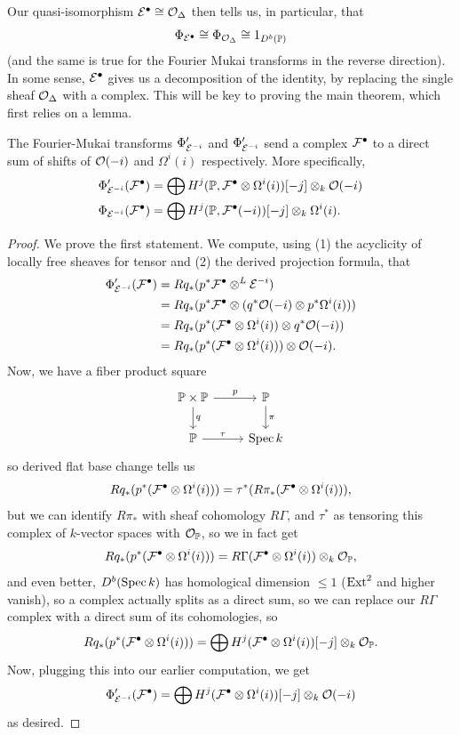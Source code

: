 \documentclass[12pt]{article}
\begin{document}
Our quasi-isomorphism $\mathcal{E}^\bullet \cong \mathcal{O}_\Delta$ then tells us, in particular, that
\[\Phi_{\mathcal{E}^\bullet} \cong \Phi_{\mathcal{O}_\Delta} \cong 1_{D^b(\mathbb{P})}\]
(and the same is true for the Fourier Mukai transforms in the reverse direction). In some sense, $\mathcal{E}^\bullet$ gives us a decomposition of the identity, by replacing the single sheaf $\mathcal{O}_\Delta$ with a complex. This will be key to proving the main theorem, which first relies on a lemma.

\begin{lem}\label{fm-against-vb-box-prod}
    The Fourier-Mukai transforms $\Phi_{\mathcal{E}^{-i}}'$ and $\Phi_{\mathcal{E}^{-i}}'$ send a complex $\mathcal{F}^\bullet$ to a direct sum of shifts of $\mathcal{O}(-i)$ and $\Omega^i(i)$ respectively. More specifically,
    \begin{align*}
        \Phi_{\mathcal{E}^{-i}}'(\mathcal{F}^\bullet) &= \bigoplus H^j(\mathbb{P},\mathcal{F}^\bullet\otimes \Omega^i(i))[-j] \otimes_k \mathcal{O}(-i)\\
        \Phi_{\mathcal{E}^{-i}}(\mathcal{F}^\bullet) &= \bigoplus H^j(\mathbb{P},\mathcal{F}^\bullet(-i))[-j] \otimes_k \Omega^i(i).
    \end{align*}
\end{lem}
\begin{proof}
    We prove the first statement. We compute, using (1) the acyclicity of locally free sheaves for tensor and (2) the derived projection formula, that
    \begin{align*}
        \Phi_{\mathcal{E}^{-i}}'(\mathcal{F}^\bullet) &= Rq_*(p^* \mathcal{F}^\bullet \otimes^L \mathcal{E}^{-i})\\
        &= Rq_*(p^*\mathcal{F}^\bullet \otimes (q^* \mathcal{O}(-i) \otimes p^*\Omega^i(i)))\\
        &= Rq_*(p^*(\mathcal{F}^\bullet \otimes \Omega^i(i)) \otimes q^* \mathcal{O}(-i))\\
        &= Rq_*(p^*(\mathcal{F}^\bullet \otimes \Omega^i(i))) \otimes \mathcal{O}(-i).
    \end{align*}
    Now, we have a fiber product square
    \[\begin{tikzcd}
        \P\times \P \rar["p"]\dar["q"] & \P\dar["\pi"]\\
        \P \rar["\tau"] & \Spec k
    \end{tikzcd}\]
    so derived flat base change tells us
    \[Rq_*(p^*(\mathcal{F}^\bullet \otimes \Omega^i(i))) = \tau^*(R\pi_*(\mathcal{F}^\bullet \otimes \Omega^i(i))),\]
    but we can identify $R\pi_*$ with sheaf cohomology $R\Gamma$, and $\tau^*$ as tensoring this complex of $k$-vector spaces with $\mathcal{O}_{\mathbb{P}}$, so we in fact get
    \[Rq_*(p^*(\mathcal{F}^\bullet \otimes \Omega^i(i))) = R\Gamma(\mathcal{F}^\bullet \otimes \Omega^i(i)) \otimes_k \mathcal{O}_{\mathbb{P}},\]
    and even better, $D^b(\operatorname{Spec} k)$ has homological dimension $\leq 1$ ($\mathrm{Ext}^2$ and higher vanish), so a complex actually splits as a direct sum, so we can replace our $R\Gamma$ complex with a direct sum of its cohomologies, so
    \[Rq_*(p^*(\mathcal{F}^\bullet \otimes \Omega^i(i))) = \bigoplus H^j(\mathcal{F}^\bullet \otimes \Omega^i(i))[-j] \otimes_k \mathcal{O}_{\mathbb{P}}.\]
    Now, plugging this into our earlier computation, we get
    \[\Phi_{\mathcal{E}^{-i}}'(\mathcal{F}^\bullet) = \bigoplus H^j(\mathcal{F}^\bullet \otimes \Omega^i(i))[-j] \otimes_k \mathcal{O}(-i)\]
    as desired.
\end{proof}
\end{document}
